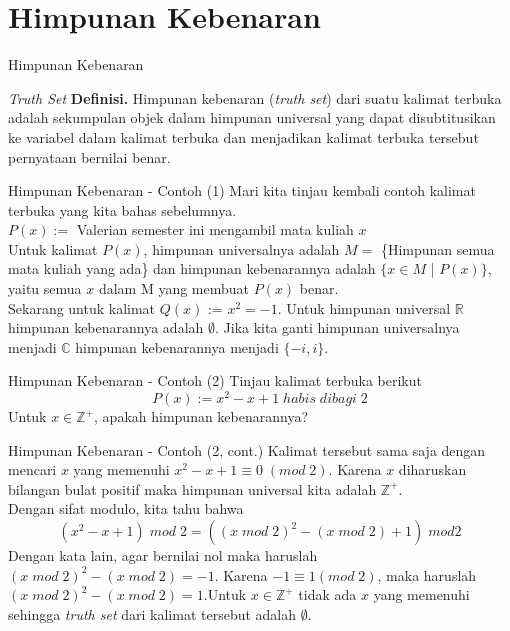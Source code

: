 \documentclass[11pt]{beamer}
\begin{document}
\section{Himpunan Kebenaran}
\begin{frame}{Himpunan Kebenaran}
\begin{block}{\textit{Truth Set}}
	\pause
	\textbf{Definisi.} Himpunan kebenaran (\textit{truth set}) dari suatu kalimat terbuka adalah sekumpulan objek dalam himpunan universal yang dapat disubtitusikan ke variabel dalam kalimat terbuka dan menjadikan kalimat terbuka tersebut pernyataan bernilai benar. \cite{TS18}
\end{block}
\end{frame}
\begin{frame}{Himpunan Kebenaran - Contoh (1)}
Mari kita tinjau kembali contoh kalimat terbuka yang kita bahas sebelumnya.\\\pause
$P(x) :=$ Valerian semester ini mengambil mata kuliah $x$
\pause
\\
Untuk kalimat $P(x)$, himpunan universalnya adalah $M =$ \{Himpunan semua mata kuliah yang ada\} dan himpunan kebenarannya adalah $\{x \in M$ | $P(x)\}$, yaitu semua $x$ dalam M yang membuat $P(x)$ benar.
\pause
\\
Sekarang untuk kalimat $Q(x)$ := $x^2 = -1$. Untuk himpunan universal $\mathbb{R}$ himpunan kebenarannya adalah $\emptyset$. Jika kita ganti himpunan universalnya menjadi $\mathbb{C}$ himpunan kebenarannya menjadi $\{-i,i\}$.
\end{frame}
\begin{frame}{Himpunan Kebenaran - Contoh (2)}
Tinjau kalimat terbuka berikut
$$P(x) := x^2 - x + 1\;habis\;dibagi\;2$$
Untuk $x \in \mathbb{Z}^+$, apakah himpunan kebenarannya?
\end{frame}
\begin{frame}{Himpunan Kebenaran - Contoh (2, cont.)}
Kalimat tersebut sama saja dengan mencari $x$ yang memenuhi $x^2 - x + 1 \equiv 0\;(mod\;2)$. Karena $x$ diharuskan bilangan bulat positif maka himpunan universal kita adalah $\mathbb{Z}^+$.\\\pause Dengan sifat modulo, kita tahu bahwa $$(x^2 - x + 1)\;mod\;2 = ((x\;mod\;2)^2-(x\;mod\;2) + 1)\;mod 2$$\pause Dengan kata lain, agar bernilai nol maka haruslah $(x\;mod\;2)^2-(x\;mod\;2) = -1$. Karena $-1 \equiv 1 (mod\;2)$, maka haruslah $(x\;mod\;2)^2-(x\;mod\;2) = 1$.\pause Untuk $x \in \mathbb{Z}^+$ tidak ada $x$ yang memenuhi sehingga \textit{truth set} dari kalimat tersebut adalah $\emptyset$.
\end{frame}
\end{document}
